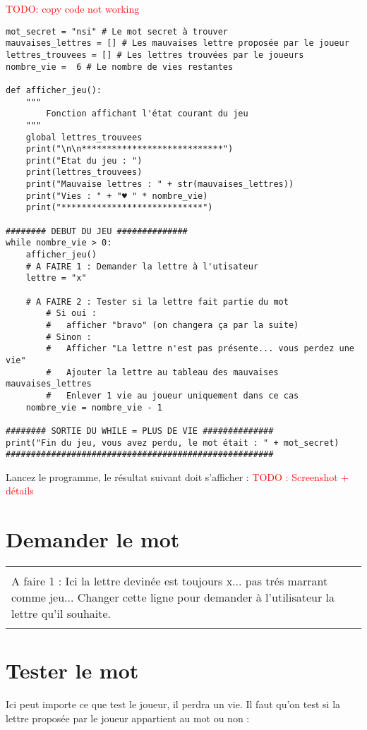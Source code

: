 \documentclass[12pt]{article}
\newcommand\todo[1]{\textcolor{red}{#1}}
\newenvironment{exercice}
    {\begin{center}
    \begin{tabular}{|p{0.9\textwidth}|}
    \hline\\
    }
    {
    \\\\\hline
    \end{tabular}
    \end{center}
    }
\begin{document}
\todo{TODO: copy code not working}
\begin{verbatim}
mot_secret = "nsi" # Le mot secret à trouver
mauvaises_lettres = [] # Les mauvaises lettre proposée par le joueur
lettres_trouvees = [] # Les lettres trouvées par le joueurs
nombre_vie =  6 # Le nombre de vies restantes

def afficher_jeu():
    """
        Fonction affichant l'état courant du jeu
    """
    global lettres_trouvees
    print("\n\n****************************")
    print("Etat du jeu : ")
    print(lettres_trouvees)
    print("Mauvaise lettres : " + str(mauvaises_lettres))
    print("Vies : " + "♥ " * nombre_vie)
    print("****************************")

######## DEBUT DU JEU ##############
while nombre_vie > 0:
    afficher_jeu()
    # A FAIRE 1 : Demander la lettre à l'utisateur
    lettre = "x"

    # A FAIRE 2 : Tester si la lettre fait partie du mot
        # Si oui :
        #   afficher "bravo" (on changera ça par la suite)
        # Sinon :
        #   Afficher "La lettre n'est pas présente... vous perdez une vie"
        #   Ajouter la lettre au tableau des mauvaises mauvaises_lettres
        #   Enlever 1 vie au joueur uniquement dans ce cas
    nombre_vie = nombre_vie - 1

######## SORTIE DU WHILE = PLUS DE VIE ##############
print("Fin du jeu, vous avez perdu, le mot était : " + mot_secret)
#####################################################

\end{verbatim}

Lancez le programme, le résultat suivant doit s'afficher :
\todo{TODO : Screenshot + détails}

\section{Demander le mot}

\begin{exercice}
\ding{46} A faire 1 : Ici la lettre devinée est toujours x... pas trés marrant comme jeu... \newline
Changer cette ligne pour demander à l'utilisateur la lettre qu'il souhaite.

\end{exercice}

\section{Tester le mot}
Ici peut importe ce que test le joueur, il perdra un vie. Il faut qu'on test si la lettre proposée par le joueur appartient au mot ou non :
\end{document}
